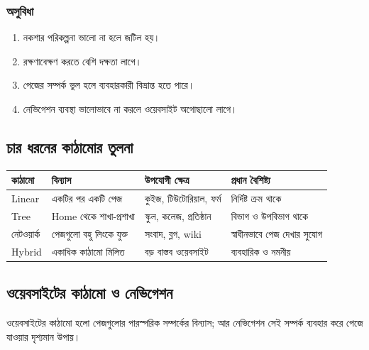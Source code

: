 \begin{minipage}[t]{.48\linewidth}\vspace{0pt}
\subsubsection{অসুবিধা}
\begin{enumerate}
\item নকশার পরিকল্পনা ভালো না হলে জটিল হয়।
\item রক্ষণাবেক্ষণ করতে বেশি দক্ষতা লাগে।
\item পেজের সম্পর্ক ভুল হলে ব্যবহারকারী বিভ্রান্ত হতে পারে।
\item নেভিগেশন ব্যবস্থা ভালোভাবে না করলে ওয়েবসাইট অগোছালো লাগে।
\end{enumerate}
\end{minipage}\par

\subsection{চার ধরনের কাঠামোর তুলনা}

\begin{center}
\begin{tabular}{|p{}|p{}|p{}|p{}|}
\hline
\textbf{কাঠামো} & \textbf{বিন্যাস} & \textbf{উপযোগী ক্ষেত্র} & \textbf{প্রধান বৈশিষ্ট্য} \\
\hline
Linear & একটির পর একটি পেজ & কুইজ, টিউটোরিয়াল, ফর্ম & নির্দিষ্ট ক্রম থাকে \\
\hline
Tree & Home থেকে শাখা-প্রশাখা & স্কুল, কলেজ, প্রতিষ্ঠান & বিভাগ ও উপবিভাগ থাকে \\
\hline
নেটওয়ার্ক & পেজগুলো বহু লিংকে যুক্ত & সংবাদ, ব্লগ, wiki & স্বাধীনভাবে পেজ দেখার সুযোগ \\
\hline
Hybrid & একাধিক কাঠামো মিলিত & বড় বাস্তব ওয়েবসাইট & ব্যবহারিক ও নমনীয় \\
\hline
\end{tabular}
\end{center}

\subsection{ওয়েবসাইটের কাঠামো ও নেভিগেশন}

ওয়েবসাইটের কাঠামো হলো পেজগুলোর পারস্পরিক সম্পর্কের বিন্যাস; আর নেভিগেশন সেই সম্পর্ক ব্যবহার করে পেজে যাওয়ার দৃশ্যমান উপায়।


